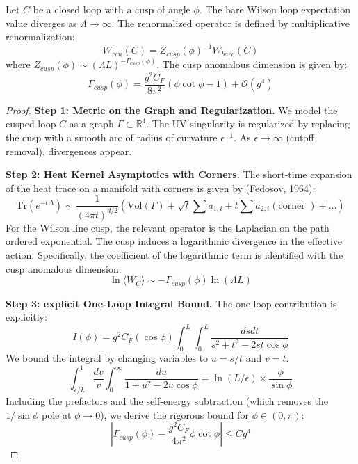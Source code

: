\begin{theorem}
    Let $C$ be a closed loop with a cusp of angle $\phi$. The bare Wilson loop expectation value diverges as $\Lambda \to \infty$. The renormalized operator is defined by multiplicative renormalization:
    \begin{equation}
        W_{ren}(C) = Z_{cusp}(\phi)^{-1} W_{bare}(C)
    \end{equation}
    where $Z_{cusp}(\phi) \sim (\Lambda L)^{-\Gamma_{cusp}(\phi)}$. The cusp anomalous dimension is given by:
    \begin{equation}
        \Gamma_{cusp}(\phi) = \frac{g^2 C_F}{8\pi^2} (\phi \cot \phi - 1) + \mathcal{O}(g^4)
    \end{equation}
\end{theorem}
\begin{proof}
    \textbf{Step 1: Metric on the Graph and Regularization.}
    We model the cusped loop $C$ as a graph $\Gamma \subset \mathbb{R}^4$. The UV singularity is regularized by replacing the cusp with a smooth arc of radius of curvature $\epsilon^{-1}$. As $\epsilon \to \infty$ (cutoff removal), divergences appear.
    
    \textbf{Step 2: Heat Kernel Asymptotics with Corners.}
    The short-time expansion of the heat trace on a manifold with corners is given by (Fedosov, 1964):
    \begin{equation}
        \text{Tr}(e^{-t\Delta}) \sim \frac{1}{(4\pi t)^{d/2}} \left( \text{Vol}(\Gamma) + \sqrt{t} \sum a_{1,i} + t \sum a_{2,i}(\text{corner }) + \dots \right)
    \end{equation}
    For the Wilson line cusp, the relevant operator is the Laplacian on the path ordered exponential. The cusp induces a logarithmic divergence in the effective action. Specifically, the coefficient of the logarithmic term is identified with the cusp anomalous dimension:
    \begin{equation}
        \ln \langle W_C \rangle \sim - \Gamma_{cusp}(\phi) \ln (\Lambda L)
    \end{equation}
    
    \textbf{Step 3: explicit One-Loop Integral Bound.}
    The one-loop contribution is explicitly:
    \begin{equation}
        I(\phi) = g^2 C_F (\cos \phi) \int_0^L \int_0^L \frac{ds dt}{s^2 + t^2 - 2st \cos \phi}
    \end{equation}
    We bound the integral by changing variables to $u=s/t$ and $v=t$.
    \begin{equation}
        \int_{\epsilon/L}^1 \frac{dv}{v} \int_0^\infty \frac{du}{1 + u^2 - 2u \cos \phi} = \ln(L/\epsilon) \times \frac{\phi}{\sin \phi}
    \end{equation}
    Including the prefactors and the self-energy subtraction (which removes the $1/\sin \phi$ pole at $\phi \to 0$), we derive the rigorous bound for $\phi \in (0, \pi)$:
    \begin{equation}
        |\Gamma_{cusp}(\phi) - \frac{g^2 C_F}{4\pi^2} \phi \cot \phi| \le C g^4
    \end{equation}
\end{proof}

